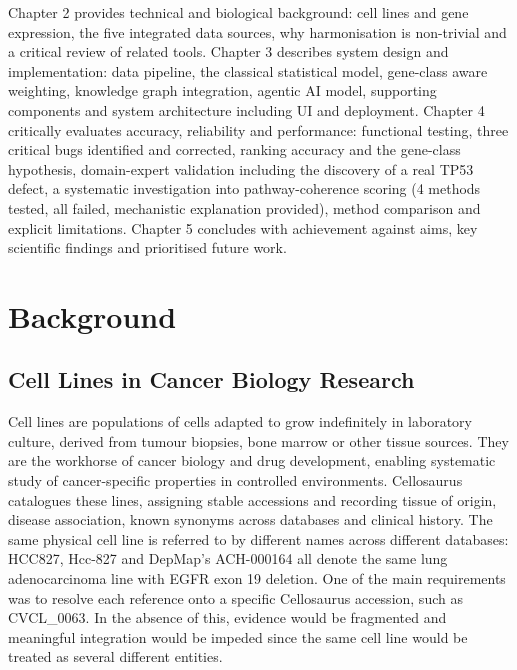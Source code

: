 \documentclass[author={Karen Coutinho, Ishaan Bhalla, Aman Raj, Dixit Kaloorani Malarmannan},
                supervisor={Dr. Daniel D'Andrea},
                degree={MSc},
                title={CellSelector Omics: A Multi-Omics Recommendation System for Cell Line Selection},
                subtitle={},
                type={},
                year={2026}]{dissertation}
\begin{document}
Chapter 2 provides technical and biological background: cell lines and gene expression, the five integrated data sources, why harmonisation is non-trivial and a critical review of related tools. Chapter 3 describes system design and implementation: data pipeline, the classical statistical model, gene-class aware weighting, knowledge graph integration, agentic AI model, supporting components and system architecture including UI and deployment. Chapter 4 critically evaluates accuracy, reliability and performance: functional testing, three critical bugs identified and corrected, ranking accuracy and the gene-class hypothesis, domain-expert validation including the discovery of a real TP53 defect, a systematic investigation into pathway-coherence scoring (4 methods tested, all failed, mechanistic explanation provided), method comparison and explicit limitations. Chapter 5 concludes with achievement against aims, key scientific findings and prioritised future work.


\chapter{Background}
\label{chap:background}

\section{Cell Lines in Cancer Biology Research}

Cell lines are populations of cells adapted to grow indefinitely in laboratory culture, derived from tumour biopsies, bone marrow or other tissue sources. They are the workhorse of cancer biology and drug development, enabling systematic study of cancer-specific properties in controlled environments. Cellosaurus \cite{bairoch2018cellosaurus} catalogues these lines, assigning stable accessions and recording tissue of origin, disease association, known synonyms across databases and clinical history. The same physical cell line is referred to by different names across different databases: HCC827, Hcc-827 and DepMap's ACH-000164 all denote the same lung adenocarcinoma line with EGFR exon 19 deletion. One of the main requirements was to resolve each reference onto a specific Cellosaurus accession, such as CVCL\_0063. In the absence of this, evidence would be fragmented and meaningful integration would be impeded since the same cell line would be treated as several different entities.
\end{document}
